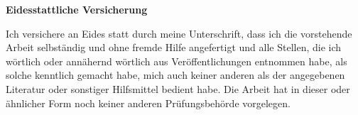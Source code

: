 %

\newpage
\textbf{Eidesstattliche Versicherung}

\bigskip

Ich versichere an Eides statt durch meine Unterschrift, dass ich die vorstehende Arbeit selbständig und ohne fremde Hilfe angefertigt und alle Stellen, die ich wörtlich oder annähernd wörtlich aus Veröffentlichungen entnommen habe, als solche kenntlich gemacht habe, mich auch keiner anderen als der angegebenen Literatur oder sonstiger Hilfsmittel bedient habe. Die Arbeit hat in dieser oder ähnlicher Form noch keiner anderen Prüfungsbehörde vorgelegen.

\vspace{1cm}
\rule{0pt}{2\baselineskip} %
\par\noindent{} \hfill\makebox[2.25in]{\hrulefill}%
\par\noindent\makebox[2.25in][l]{} \hfill{}%
